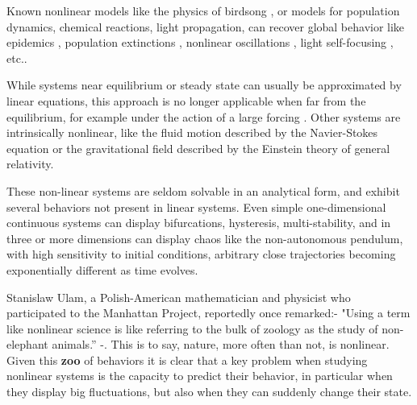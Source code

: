 %	
%	
%	
%	
%	
%	
%	


Known nonlinear models like the physics of birdsong \citep{Mindlin2005}, or models for population dynamics, chemical reactions, light propagation, can recover global behavior like epidemics \citep{Southall2021}, population extinctions \citep{Jackson2001}, nonlinear oscillations \citep{Diz-Pita2021}, light self-focusing \citep{Bejot2011}, etc.. 

While systems near equilibrium  or steady state can usually be approximated by linear equations, this approach is no longer applicable when far from the equilibrium, for example under the action of a large forcing \citep{Londono2015}.%
Other systems are  intrinsically nonlinear, like the fluid motion described by the Navier-Stokes equation or the gravitational field described by the Einstein theory of general relativity.%


These non-linear systems are seldom solvable in an analytical form, and exhibit several behaviors not present in linear systems. Even simple one-dimensional continuous systems can display bifurcations, hysteresis, multi-stability, and in three or more dimensions can display chaos like the non-autonomous pendulum, with high sensitivity to initial conditions,  arbitrary close trajectories becoming exponentially different as time evolves. 


Stanislaw Ulam, a Polish-American mathematician and physicist who participated to the Manhattan Project, reportedly once remarked:- "Using a term like nonlinear science is like referring to the bulk of zoology as the study of non-elephant animals.” -.
This is to say, nature, more often than not,  is nonlinear.
Given this \textbf{zoo} of behaviors it is clear that a key problem when studying nonlinear systems is the capacity to predict their behavior, in particular when they  display big fluctuations, but also when they can suddenly change their state. 


